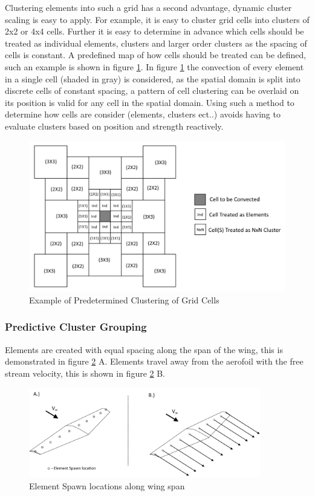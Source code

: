 Clustering elements into such a grid has a second advantage, dynamic cluster scaling is easy to apply. For example, it is easy to cluster grid cells into clusters of 2x2 or 4x4 cells. Further it is easy to determine in advance which cells should be treated as individual elements, clusters and larger order clusters as the spacing of cells is constant. A predefined map of how cells should be treated can be defined, such an example is shown in figure \ref{fig:GridClustering}. In figure \ref{fig:GridClustering} the convection of every element in a single cell (shaded in gray) is considered, as the spatial domain is split into discrete cells of constant spacing, a pattern of cell clustering can be overlaid on its position is valid for any cell in the spatial domain. Using such a method to determine how cells are consider (elements, clusters ect..) avoids having to evaluate clusters based on position and strength reactively.
\begin{figure}[H]
\centering
\includegraphics[width=1.10\textwidth]{Figures/CellClustering.png}
\caption{\label{fig:GridClustering} Example of Predetermined Clustering of Grid Cells}
\end{figure} 


\subsubsection{Predictive Cluster Grouping}
Elements are created with equal spacing along the span of the wing, this is demonstrated in figure \ref{fig:ElementLocations} A. Elements travel  away from the aerofoil with the free stream velocity, this is shown in figure \ref{fig:ElementLocations} B.

\begin{figure}[H]
\centering
\includegraphics[width=0.9\textwidth]{Figures/ElementSpawnLocations.png}
\caption{\label{fig:ElementLocations} Element Spawn locations along wing span}
\end{figure} 

